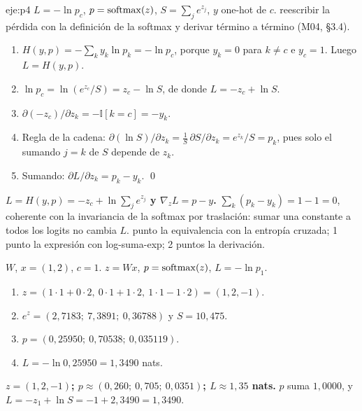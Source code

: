 \begin{solucion}{eje:p4}
\datos $L=-\ln p_c$, $p=\operatorname{softmax}(z)$, $S=\sum_j e^{z_j}$, $y$ one-hot de $c$.
\planteamiento reescribir la pérdida con la definición de la softmax y derivar término a término (M04, §3.4).
\pasos
\begin{enumerate}[label=\arabic*.]
  \item $H(y,p)=-\sum_k y_k\ln p_k=-\ln p_c$, porque $y_k=0$ para $k\neq c$ e $y_c=1$. Luego $L=H(y,p)$.
  \item $\ln p_c=\ln(e^{z_c}/S)=z_c-\ln S$, de donde $L=-z_c+\ln S$.
  \item $\partial(-z_c)/\partial z_k=-\mathbb I[k=c]=-y_k$.
  \item Regla de la cadena: $\partial(\ln S)/\partial z_k=\frac1S\,\partial S/\partial z_k=e^{z_k}/S=p_k$, pues solo el sumando $j=k$ de $S$ depende de $z_k$.
  \item Sumando: $\partial L/\partial z_k=p_k-y_k$. \qed
\end{enumerate}
\resultado \textbf{$L=H(y,p)=-z_c+\ln\sum_je^{z_j}$ y $\nabla_zL=p-y$.}
\comprobacion $\sum_k(p_k-y_k)=1-1=0$, coherente con la invariancia de la softmax por traslación: sumar una constante a todos los logits no cambia $L$.
 punto la equivalencia con la entropía cruzada; 1 punto la expresión con log-suma-exp; 2 puntos la derivación.

\datos $W$, $x=(1,2)$, $c=1$.
\planteamiento $z=Wx$, $p=\operatorname{softmax}(z)$, $L=-\ln p_1$.
\pasos
\begin{enumerate}[label=\arabic*.]
  \item $z=(1\cdot1+0\cdot2,\ 0\cdot1+1\cdot2,\ 1\cdot1-1\cdot2)=(1,2,-1)$.
  \item $e^{z}=(2{,}7183;\ 7{,}3891;\ 0{,}36788)$ y $S=10{,}475$.
  \item $p=(0{,}25950;\ 0{,}70538;\ 0{,}035119)$.
  \item $L=-\ln 0{,}25950=1{,}3490$ nats.
\end{enumerate}
\resultado \textbf{$z=(1,2,-1)$; $p\approx(0{,}260;\ 0{,}705;\ 0{,}0351)$; $L\approx 1{,}35$ nats.}
\comprobacion $p$ suma $1{,}0000$, y $L=-z_1+\ln S=-1+2{,}3490=1{,}3490$.


\end{solucion}
